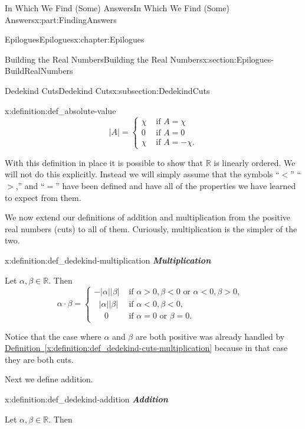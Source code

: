 \documentclass[oneside,10pt,]{book}
\newcommand{\xreffont}{\relax}
\newcommand{\alert}[1]{\textbf{\textit{#1}}}
\numberwithin{equation}{section}
\newcommand{\abs}[1]{\left|#1\right|}
\newcommand{\RR}{\mathbb {R}}
\newcommand{\lt}{<}
\newcommand{\amp}{&}
\begin{document}
\begin{partptx}{In Which We Find (Some) Answers}{}{In Which We Find (Some) Answers}{}{}{x:part:FindingAnswers}
\begin{chapterptx}{Epilogues}{}{Epilogues}{}{}{x:chapter:Epilogues}
\begin{sectionptx}{Building the Real Numbers}{}{Building the Real Numbers}{}{}{x:section:Epilogues-BuildRealNumbers}
\begin{subsectionptx}{Dedekind Cuts}{}{Dedekind Cuts}{}{}{x:subsection:DedekindCuts}
\begin{definition}{}{x:definition:def_absolute-value}
\begin{equation*}
\abs{A}= \begin{cases}\chi \amp  \text{ if \(A=\chi{}\)} \\ 0 \amp  \text{ if \(A=0\) } \\ \chi \amp  \text{ if \(A=-\chi{}.\)} {} \end{cases}
\end{equation*}
%
\end{definition}
With this definition in place it is possible to show that \(\RR\) is linearly ordered. We will not do this explicitly. Instead we will simply assume that the symbols ``\(\lt\)'' ``\(>\),'' and ``\(=\)'' have been defined and have all of the properties we have learned to expect from them.%
\par
We now extend our definitions of addition and multiplication from the positive real numbers (cuts) to all of them. Curiously, multiplication is the simpler of the two.%
\begin{definition}{}{x:definition:def_dedekind-multiplication}%
\alert{Multiplication}%
\par
{} Let \(\alpha, \beta\in\RR\). Then%
\begin{equation*}
\alpha\cdot\beta = \begin{cases}-\abs{\alpha}\abs{\beta}\amp  \text{ if \(\alpha>0,\beta\lt 0\) or \(\alpha\lt 0, \beta>0,\) }  \\ \ \ \,\abs{\alpha}\abs{\beta}\amp  \text{ if \(\alpha\lt 0,\beta\lt 0,\) }  \\ \ \ \ \ \ \, 0\amp  \text{ if \(\alpha=0\) or \(\beta=0.\) }  {} \end{cases}
\end{equation*}
%
\end{definition}
Notice that the case where \(\alpha\) and \(\beta\) are both positive was already handled by \hyperref[x:definition:def_dedekind-cuts-multiplication]{Definition~{\xreffont\ref{x:definition:def_dedekind-cuts-multiplication}}} because in that case they are both cuts.%
\par
Next we define addition.%
\begin{definition}{}{x:definition:def_dedekind-addition}%
\alert{Addition}%
\par
{} Let \(\alpha, \beta\in\RR\). Then%
\begin{equation*}

\end{equation*}
\end{definition}
\end{subsectionptx}
\end{sectionptx}
\end{chapterptx}
\end{partptx}
\end{document}

